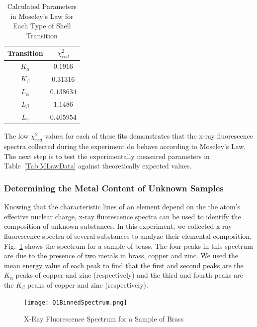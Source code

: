 \documentclass[%
 reprint,
 amsmath,amssymb,
 aps,
 pra,
]{revtex4-1}
\begin{document}
\begin{table}[htbp]
	\begin{center}
		\begin{tabular}{|c|c|}
			\hline Transition & $\chi_{red}^2$ \\
			\hline $K_{\alpha}$ & $0.1916$ \\
			\hline $K_{\beta}$ & $0.31316$ \\
			\hline $L_{\alpha}$ & $0.138634$ \\
			\hline $L_{\beta}$ & $1.1486$ \\
			\hline $L_{\gamma}$ & $0.405954$ \\
			\hline
		\end{tabular}
	\end{center}
	\caption{Calculated Parameters in Moseley's Law for Each Type of Shell Transition}
	\label{Tab:MLawChiSq}
\end{table}

The low $\chi_{red}^2$ values for each of these fits demonstrates that the x-ray fluorescence spectra collected during the experiment do behave according to Moseley's Law. The next step is to test the experimentally measured parameters in Table~\ref{Tab:MLawData} against theoretically expected values.

\subsubsection{Determining the Metal Content of Unknown Samples}

Knowing that the characteristic lines of an element depend on the the atom's effective nuclear charge, x-ray fluorescence spectra can be used to identify the composition of unknown substances. In this experiment, we collected x-ray fluorescence spectra of several substances to analyze their elemental composition. Fig.~\ref{fig:brass_spectra} shows the spectrum for a sample of brass. The four peaks in this spectrum are due to the presence of two metals in brass, copper and zinc. We used the mean energy value of each peak to find that the first and second peaks are the $K_{\alpha}$ peaks of copper and zinc (respectively) and the third and fourth peaks are the $K_{\beta}$ peaks of copper and zinc (respectively). 

\begin{figure}[H]
	\centering
	\texttt{[image: Q1BinnedSpectrum.png]}
	\caption{X-Ray Fluorescence Spectrum for a Sample of Brass}
	\label{fig:brass_spectra}
\end{figure}
\end{document}
